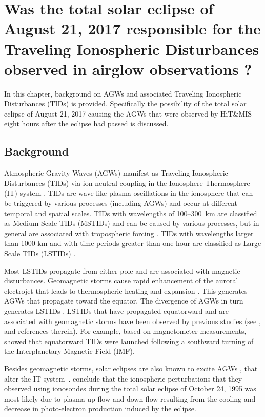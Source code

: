 \documentclass[crop=false,class=mitthesis,oneside,font=12pt]{standalone}
\begin{document}
\chapter{Was the total solar eclipse of August 21, 2017 responsible for the Traveling Ionospheric Disturbances observed in airglow observations ?}
In this chapter, background on AGWs and associated Traveling Ionospheric Disturbances (TIDs) is provided. Specifically the possibility of the total solar eclipse of August 21, 2017 causing the AGWs that were observed by HiT\&MIS eight hours after the eclipse had passed is discussed. 
\section{Background} 

Atmospheric Gravity Waves (AGWs) manifest as Traveling Ionospheric Disturbances (TIDs) via ion-neutral coupling in the Ionosphere-Thermosphere (IT) system \citep{hines_1960}. TIDs are wave-like plasma oscillations in the ionosphere that can be triggered by various processes (including AGWs) and occur at different temporal and spatial scales. TIDs with wavelengths of 100--300~km are classified as Medium Scale TIDs (MSTIDs) and can be caused by various processes, but in general are associated with tropospheric forcing \citep{kelley}. TIDs with wavelengths larger than 1000 km and with time periods greater than one hour are classified as Large Scale TIDs (LSTIDs) \citep{hocke1996review}.

Most LSTIDs propagate from either pole and are associated with magnetic disturbances. Geomagnetic storms cause rapid enhancement of the auroral electrojet that leads to thermospheric heating and expansion \citep{davis_polar_1971,chimonas_atmospheric_1970}. This generates AGWs that propagate toward the equator. The divergence of AGWs in turn generates LSTIDs \citep{prolss_lstid_2000}. LSTIDs that have propagated equatorward and are associated with geomagnetic storms have been observed by previous studies (see \citet{habarulema_storm_tid}, and references therein). For example, based on magnetometer measurements, \citet{habarulema_storm_tid} showed that equatorward TIDs were launched following a southward turning of the Interplanetary Magnetic Field (IMF).

Besides geomagnetic storms, solar eclipses are also known to excite AGWs \citep[e.g.,][]{liu_1998, chimonas1970}, that alter the  IT system~\citep{Lin2018,harding_nightside_eclipse}. \citet{liu_1998} conclude that the ionospheric perturbations that they observed using ionosondes during the total solar eclipse of October 24, 1995 was most likely due to plasma up-flow and down-flow resulting from the cooling and decrease in photo-electron production induced by the eclipse.
\end{document}
